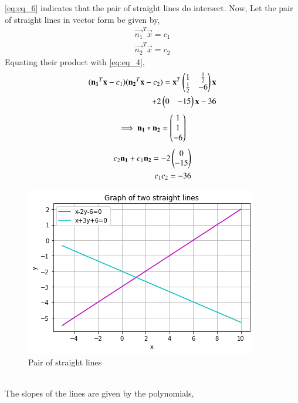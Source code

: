 \documentclass[journal,12pt,twocolumn]{IEEEtran}
\begin{document}
\eqref{eq:eq_6} indicates that the pair of straight lines do intersect. 
Now, Let the pair of straight lines in vector form be given by,
\begin{align}
    \vec{n_1}^T\vec{x}=c_1 \label{eq:eq_7}\\
    \vec{n_2}^T\vec{x}=c_2 \label{eq:eq_8}
\end{align}
Equating their product with \eqref{eq:eq_4},
\begin{align} 
    (\mathbf{n_1}^T\mathbf{x}-c_1)(\mathbf{n_2}^T\mathbf{x}-c_2)=\mathbf{x}^T\begin{pmatrix}1 & \frac{1}{2} \\ \frac{1}{2} & -6\end{pmatrix}\mathbf{x} \nonumber \\+2\begin{pmatrix}0 & -15\end{pmatrix}\mathbf{x}-36 \label{eq:eq_9}
\end{align}
\begin{align}
    \implies \mathbf{n_1} * \mathbf{n_2} = \begin{pmatrix}1 \\ 1 \\ -6\end{pmatrix} \label{eq:eq_10} 
\end{align}    
\begin{align}
    c_2\mathbf{n_1}+c_1\mathbf{n_2} = -2\begin{pmatrix}0 \\ -15\end{pmatrix} \label{eq:eq_11} \\
    c_1c_2 = -36 \label{eq:eq_12}
\end{align}
\renewcommand{\thefigure}{1}
\begin{figure}[h!]
    \centering
    \includegraphics[width=\columnwidth]{Assignment_6_Plot.png}
    \caption{Pair of straight lines}
    \label{Fig:1}
\end{figure} \\
The slopes of the lines are given by the polynomials,
\end{document}
